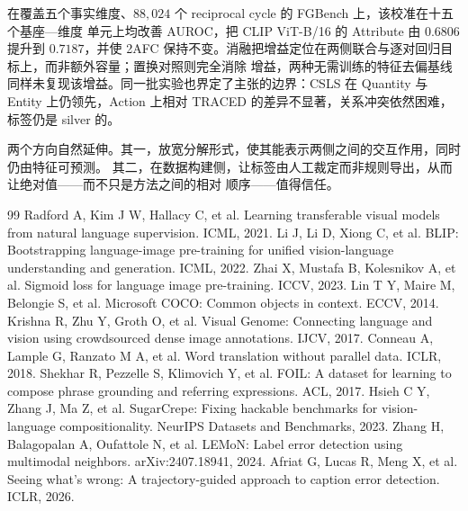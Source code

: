 \documentclass[10pt,twocolumn,a4paper]{ctexart}
\begin{document}
在覆盖五个事实维度、$88{,}024$ 个 reciprocal cycle 的 FGBench 上，该校准在十五个基座—维度
单元上均改善 AUROC，把 CLIP ViT-B/16 的 Attribute 由 $0.6806$ 提升到 $0.7187$，并使 2AFC
保持不变。消融把增益定位在两侧联合与逐对回归目标上，而非额外容量；置换对照则完全消除
增益，两种无需训练的特征去偏基线同样未复现该增益。同一批实验也界定了主张的边界：CSLS 在 Quantity 与 Entity 上仍领先，Action 上相对
TRACED 的差异不显著，关系冲突依然困难，标签仍是 silver 的。

两个方向自然延伸。其一，放宽分解形式，使其能表示两侧之间的交互作用，同时仍由特征可预测。
其二，在数据构建侧，让标签由人工裁定而非规则导出，从而让绝对值——而不只是方法之间的相对
顺序——值得信任。

\begin{thebibliography}{99}
\small
{} Radford A, Kim J W, Hallacy C, et al. Learning transferable visual models from natural language supervision. ICML, 2021.
 Li J, Li D, Xiong C, et al. BLIP: Bootstrapping language-image pre-training for unified vision-language understanding and generation. ICML, 2022.
 Zhai X, Mustafa B, Kolesnikov A, et al. Sigmoid loss for language image pre-training. ICCV, 2023.
 Lin T Y, Maire M, Belongie S, et al. Microsoft COCO: Common objects in context. ECCV, 2014.
 Krishna R, Zhu Y, Groth O, et al. Visual Genome: Connecting language and vision using crowdsourced dense image annotations. IJCV, 2017.
 Conneau A, Lample G, Ranzato M A, et al. Word translation without parallel data. ICLR, 2018.
 Shekhar R, Pezzelle S, Klimovich Y, et al. FOIL: A dataset for learning to compose phrase grounding and referring expressions. ACL, 2017.
 Hsieh C Y, Zhang J, Ma Z, et al. SugarCrepe: Fixing hackable benchmarks for vision-language compositionality. NeurIPS Datasets and Benchmarks, 2023.
 Zhang H, Balagopalan A, Oufattole N, et al. LEMoN: Label error detection using multimodal neighbors. arXiv:2407.18941, 2024.
 Afriat G, Lucas R, Meng X, et al. Seeing what's wrong: A trajectory-guided approach to caption error detection. ICLR, 2026.
\end{thebibliography}
\end{document}
